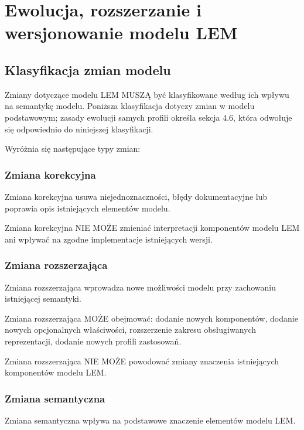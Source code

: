 
\chapter{Ewolucja, rozszerzanie i wersjonowanie modelu LEM}
\label{chap:ewolucja}

\section{Klasyfikacja zmian modelu}
Zmiany dotyczące modelu LEM MUSZĄ być klasyfikowane według ich wpływu na semantykę modelu. Poniższa klasyfikacja dotyczy zmian w modelu podstawowym; zasady ewolucji samych profili określa sekcja 4.6, która odwołuje się odpowiednio do niniejszej klasyfikacji.

Wyróżnia się następujące typy zmian:

\subsection{Zmiana korekcyjna}
Zmiana korekcyjna usuwa niejednoznaczności, błędy dokumentacyjne lub poprawia opis istniejących elementów modelu.

Zmiana korekcyjna NIE MOŻE zmieniać interpretacji komponentów modelu LEM ani wpływać na zgodne implementacje istniejących wersji.

\subsection{Zmiana rozszerzająca}
Zmiana rozszerzająca wprowadza nowe możliwości modelu przy zachowaniu istniejącej semantyki.

Zmiana rozszerzająca MOŻE obejmować: dodanie nowych komponentów, dodanie nowych opcjonalnych właściwości, rozszerzenie zakresu obsługiwanych reprezentacji, dodanie nowych profili zastosowań.

Zmiana rozszerzająca NIE MOŻE powodować zmiany znaczenia istniejących komponentów modelu LEM.

\subsection{Zmiana semantyczna}
Zmiana semantyczna wpływa na podstawowe znaczenie elementów modelu LEM.

